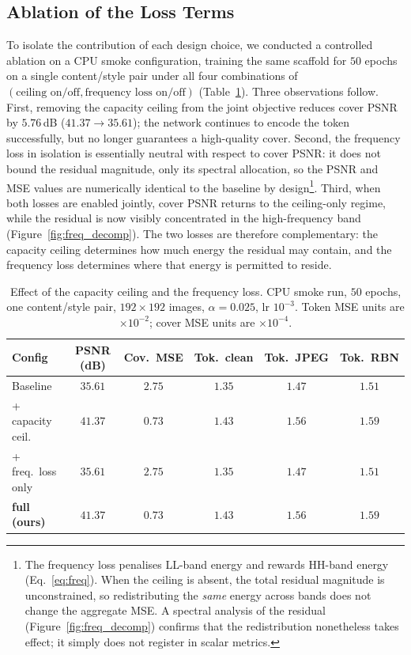 \documentclass[conference]{IEEEtran}
\begin{document}
\subsection{Ablation of the Loss Terms}
\label{sec:ablation}
To isolate the contribution of each design choice, we conducted a controlled ablation on a CPU smoke configuration, training the same scaffold for $50$ epochs on a single content/style pair under all four combinations of $(\text{ceiling on/off}, \text{frequency loss on/off})$ (Table~\ref{tab:ablation}). Three observations follow. First, removing the capacity ceiling from the joint objective reduces cover PSNR by $5.76$\,dB ($41.37\to35.61$); the network continues to encode the token successfully, but no longer guarantees a high-quality cover. Second, the frequency loss in isolation is essentially neutral with respect to cover PSNR: it does not bound the residual magnitude, only its spectral allocation, so the PSNR and MSE values are numerically identical to the baseline by design\footnote{The frequency loss penalises LL-band energy and rewards HH-band energy (Eq.~\ref{eq:freq}). When the ceiling is absent, the total residual magnitude is unconstrained, so redistributing the \emph{same} energy across bands does not change the aggregate MSE. A spectral analysis of the residual (Figure~\ref{fig:freq_decomp}) confirms that the redistribution nonetheless takes effect; it simply does not register in scalar metrics.}. Third, when both losses are enabled jointly, cover PSNR returns to the ceiling-only regime, while the residual is now visibly concentrated in the high-frequency band (Figure~\ref{fig:freq_decomp}). The two losses are therefore complementary: the capacity ceiling determines how much energy the residual may contain, and the frequency loss determines where that energy is permitted to reside.

\begin{table}[t]
\centering
\caption{Effect of the capacity ceiling and the frequency loss. CPU smoke run, $50$ epochs, one content/style pair, $192\!\times\!192$ images, $\alpha=0.025$, lr $10^{-3}$. Token MSE units are $\times10^{-2}$; cover MSE units are $\times10^{-4}$.}
\label{tab:ablation}
\setlength{\tabcolsep}{18pt}
\small
\begin{tabular}{lccccc}
\toprule
\textbf{Config} & \textbf{PSNR (dB)} & \textbf{Cov.\ MSE} & \textbf{Tok.\ clean} & \textbf{Tok.\ JPEG} & \textbf{Tok.\ RBN} \\
\midrule
Baseline             & $35.61$  & $2.75$ & $1.35$ & $1.47$ & $1.51$ \\
\rowcolor{rowshade}
+ capacity ceil.     & $41.37$  & $0.73$ & $1.43$ & $1.56$ & $1.59$ \\
+ freq.\ loss only   & $35.61$  & $2.75$ & $1.35$ & $1.47$ & $1.51$ \\
\rowcolor{rowshade}
\textbf{full (ours)} & $\mathbf{41.37}$ & $\mathbf{0.73}$ & $1.43$ & $1.56$ & $1.59$ \\
\bottomrule
\end{tabular}
\end{table}
\end{document}
